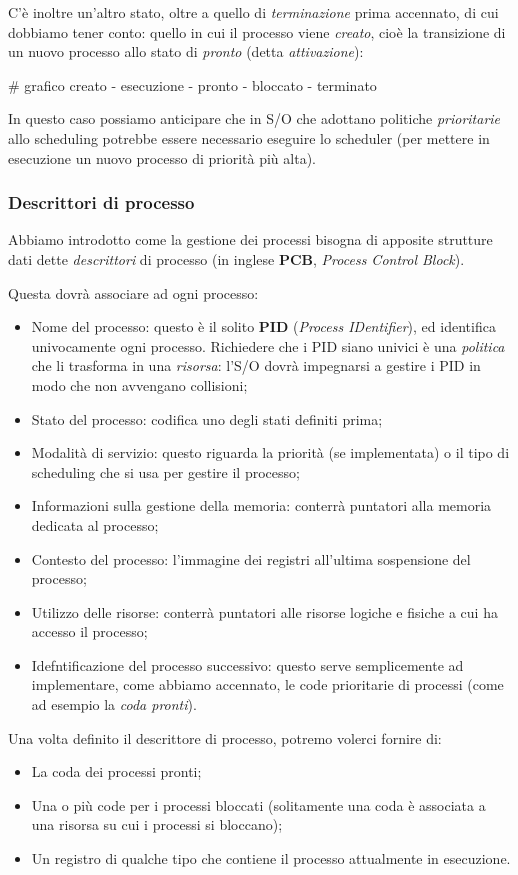 \documentclass[a4paper,11pt]{article}
\begin{document}
C'è inoltre un'altro stato, oltre a quello di \textit{terminazione} prima accennato, di cui dobbiamo tener conto: quello in cui il processo viene \textit{creato}, cioè la transizione di un nuovo processo allo stato di \textit{pronto} (detta \textit{attivazione}):

# grafico creato - esecuzione - pronto - bloccato - terminato 

In questo caso possiamo anticipare che in S/O che adottano politiche \textit{prioritarie} allo scheduling potrebbe essere necessario eseguire lo scheduler (per mettere in esecuzione un nuovo processo di priorità più alta).

\subsubsection{Descrittori di processo}
Abbiamo introdotto come la gestione dei processi bisogna di apposite strutture dati dette \textit{descrittori} di processo (in inglese \textbf{PCB}, \textit{Process Control Block}).

Questa dovrà associare ad ogni processo:
\begin{itemize}
	\item Nome del processo: questo è il solito \textbf{PID} (\textit{Process IDentifier}), ed identifica univocamente ogni processo. Richiedere che i PID siano univici è una \textit{politica} che li trasforma in una \textit{risorsa}: l'S/O dovrà impegnarsi a gestire i PID in modo che non avvengano collisioni;
	\item Stato del processo: codifica uno degli stati definiti prima;
	\item Modalità di servizio: questo riguarda la priorità (se implementata) o il tipo di scheduling che si usa per gestire il processo;
	\item Informazioni sulla gestione della memoria: conterrà puntatori alla memoria dedicata al processo;
	\item Contesto del processo: l'immagine dei registri all'ultima sospensione del processo;
	\item Utilizzo delle risorse: conterrà puntatori alle risorse logiche e fisiche a cui ha accesso il processo;
	\item Idefntificazione del processo successivo: questo serve semplicemente ad implementare, come abbiamo accennato, le code prioritarie di processi (come ad esempio la \textit{coda pronti}).
\end{itemize}

Una volta definito il descrittore di processo, potremo volerci fornire di:
\begin{itemize}
	\item La coda dei processi pronti;
	\item Una o più code per i processi bloccati (solitamente una coda è associata a una risorsa su cui i processi si bloccano);
	\item Un registro di qualche tipo che contiene il processo attualmente in esecuzione. 
\end{itemize}
\end{document}
